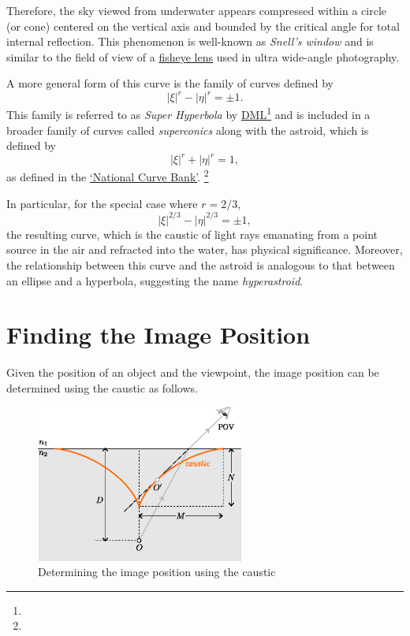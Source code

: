 \documentclass[twocolumn]{article}
\begin{document}
Therefore, the sky viewed from underwater appears compressed within a circle (or cone) centered on the vertical axis and bounded by the critical angle for total internal reflection. This phenomenon is well-known as \emph{Snell's window} and is similar to the field of view of a \href{https://en.wikipedia.org/wiki/Fisheye_lens}{fisheye lens} used in ultra wide-angle photography.

A more general form of this curve is the family of curves defined by
$$ \left| \xi \right|^{r} - \left| \eta \right|^{r} = \pm 1. $$
This family is referred to as \emph{Super Hyperbola} by \href{http://dynamicmathematicslearning.com/super-ellipse.html}{DML}\footnote{} and is included in a broader family of curves called \emph{superconics} along with the astroid, which is defined by
$$ \left| \xi \right|^{r} + \left| \eta \right|^{r} = 1, $$ 
as defined in the  \href{https://old.nationalcurvebank.org/superconicncb/superconicncb.htm}{`National Curve Bank'}.%
\footnote{}

In particular, for the special case where $r = 2/3$,
$$ \left| \xi \right|^{2/3} - \left| \eta \right|^{2/3} = \pm1, $$
the resulting curve, which is the caustic of light rays emanating from a point source in the air and refracted into the water, has physical significance. Moreover, the relationship between this curve and the astroid is analogous to that between an ellipse and a hyperbola, suggesting the name \emph{hyperastroid}. 

\section{Finding the Image Position}

Given the position of an object and the viewpoint, the image position can be determined using the caustic as follows.

\begin{figure}[!h]
	\centering
	\includegraphics[width=2.7in]{figs/g394.eps}
	\caption{Determining the image position using the caustic}
	\label{fig:image_caustic}
\end{figure}
\end{document}
